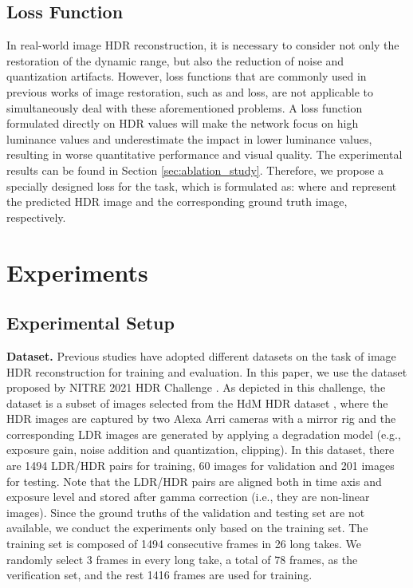 \documentclass[final]{cvpr}
\begin{document}
\subsection{Loss Function}\label{sec:loss_function}
In real-world image HDR reconstruction, it is necessary to consider not only the restoration of the dynamic range, but also the reduction of noise and quantization artifacts. However, loss functions that are commonly used in previous works of image restoration, such as  and  loss, are not applicable to simultaneously deal with these aforementioned problems. A loss function formulated directly on HDR values will make the network focus on high luminance values and underestimate the impact in lower luminance values, resulting in worse quantitative performance and visual quality. The experimental results can be found in Section \ref{sec:ablation_study}. Therefore, we propose a specially designed  loss for the task, which is formulated as:
 where  and  represent the predicted HDR image and the corresponding ground truth image, respectively.

\section{Experiments}
\subsection{Experimental Setup}\label{sec:experimental_setup}
\textbf{Dataset.} Previous studies \cite{endo2017deep, eilertsen2017hdr, liu2020single, kim2019deep} have adopted different datasets on the task of image HDR reconstruction for training and evaluation. In this paper, we use the dataset proposed by NITRE 2021 HDR Challenge \cite{perez2021ntire}. As depicted in this challenge, the dataset is a subset of images selected from the HdM HDR dataset \cite{froehlich2014creating}, where the HDR images are captured by two Alexa Arri cameras with a mirror rig and the corresponding LDR images are generated by applying a degradation model (e.g., exposure gain, noise addition and quantization, clipping). In this dataset, there are 1494 LDR/HDR pairs for training, 60 images for validation and 201 images for testing. Note that the LDR/HDR pairs are aligned both in time axis and exposure level and stored after gamma correction (i.e., they are non-linear images). Since the ground truths of the validation and testing set are not available, we conduct the experiments only based on the training set. The training set is composed of 1494 consecutive frames in 26 long takes. We randomly select 3 frames in every long take, a total of 78 frames, as the verification set, and the rest 1416 frames are used for training. 
\end{document}
